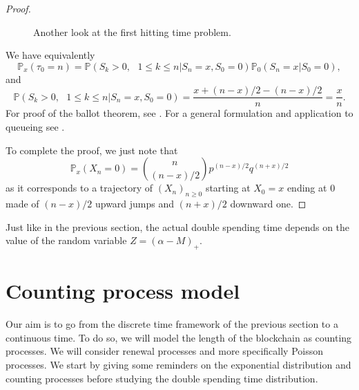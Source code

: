 \begin{proof}
\begin{remark}
\begin{figure}[ht!]
\begin{center}
{\begin{tikzpicture}
\end{tikzpicture}
\label{subfig:time_reversed_ds_RW_time}
}
\end{center}
\caption{Another look at the first hitting time problem.}
\label{fig:time_reversed_double_spending_time}
\end{figure}
We have equivalently
$$
\mathbb{P}_x(\tau_0=n) = \mathbb{P}(S_k>0,\text{ }1\leq k\leq n|S_n = x, S_0 = 0)\mathbb{P}_0(S_n = x|S_0=0),
$$
and 
$$
\mathbb{P}(S_k>0,\text{ }1\leq k\leq n|S_n = x, S_0 = 0) = \frac{x+(n-x)/2-(n-x)/2}{n} = \frac{x}{n}.
$$
For proof of the ballot theorem, see \citet{Renault2007}. For a general formulation and application to queueing see \citet{Takacs1962}.
\end{remark}
To complete the proof, we just note that 
$$
\mathbb{P}_x(X_n = 0) = \binom{n}{(n-x) / 2}p^{(n-x) / 2}q^{(n
+x) / 2}
$$
as it corresponds to a trajectory of $(X_n)_{n \geq0}$ starting at $X_0 = x$ ending at $0$ made of $(n-x)/2$ upward jumps and $(n+x)/2$ downward one.
\end{proof}
Just like in the previous section, the actual double spending time depends on the value of the random variable $Z = (\alpha -M)_+$.

\section{Counting process model}\label{sec:counting_process}
Our aim is to go from the discrete time framework of the previous section to a continuous time. To do so, we will model the length of the blockchain as counting processes. We will consider renewal processes and more specifically Poisson processes. We start by giving some reminders on the exponential distribution and counting processes before studying the double spending time distribution.

